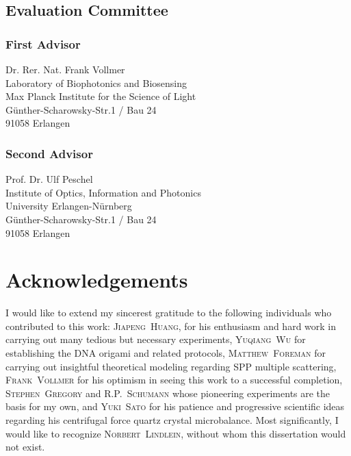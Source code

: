 \documentclass[a4paper,titlepage,onecolumn]{report}
\makeatletter
\newcommand{\name}[1]{\textsc{#1}}
\renewcommand{\todo}[2][]{\tikzexternaldisable\@todo[#1]{#2}\tikzexternalenable}
\makeatother
\begin{document}
\section*{Evaluation Committee}
\subsection*{First Advisor}
Dr. Rer. Nat. Frank Vollmer\\
Laboratory of Biophotonics and Biosensing\\
Max Planck Institute for the Science of Light\\
G\"unther-Scharowsky-Str.1 / Bau 24\\
91058 Erlangen
\subsection*{Second Advisor}
Prof. Dr. Ulf Peschel\\
Institute of Optics, Information and Photonics\\
University Erlangen-N\"urnberg\\
G\"unther-Scharowsky-Str.1 / Bau 24\\
91058 Erlangen

\newpage
\chapter*{Acknowledgements}
I would like to extend my sincerest gratitude to the following individuals
who contributed to this work: \name{Jiapeng~Huang}, for his enthusiasm
and hard work in carrying out many tedious but necessary experiments,
\name{Yuqiang~Wu} for establishing the DNA origami and related protocols,
\name{Matthew~Foreman} for carrying out insightful theoretical modeling
regarding SPP multiple scattering, \name{Frank~Vollmer} for his optimism
in seeing this work to a successful completion, \name{Stephen~Gregory}
and \name{R\@.P.\@~Schumann} whose pioneering experiments are the basis
for my own, and \name{Yuki~Sato} for his patience and progressive
scientific ideas regarding his centrifugal force quartz crystal
microbalance.  Most significantly, I would like to recognize
\name{Norbert~Lindlein}, without whom this dissertation would not exist.

\tableofcontents

\begin{abstract}
 \todo{Abstract is written last.}
\end{abstract}
\end{document}
